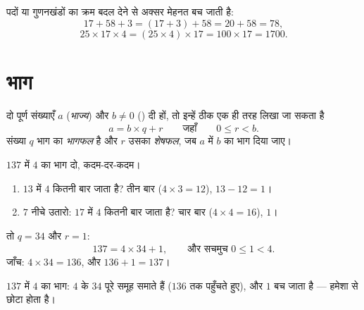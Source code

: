 \begin{example}[चतुराई से गणना]\label{ex:g6:wholes:smart}
पदों या गुणनखंडों का क्रम बदल देने से अक्सर मेहनत बच जाती है:
\[
17 + 58 + 3 = (17 + 3) + 58 = 20 + 58 = 78 ,
\]
\[
25 \times 17 \times 4 = (25 \times 4) \times 17 = 100 \times 17 = 1700 .
\]
\end{example}

\section{भाग}

\begin{theorem}[यूक्लिडीय भाग]\label{thm:g6:wholes:division}
दो पूर्ण संख्याएँ $a$ (\emph{भाज्य}) और $b \neq 0$
(\emph{}) दी हों, तो इन्हें ठीक एक ही तरह लिखा जा सकता है
\[
a = b \times q + r
\qquad\text{जहाँ}\qquad
0 \leq r < b .
\]
संख्या $q$ भाग का \emph{भागफल} है और $r$ उसका
\emph{शेषफल}, जब $a$ में $b$ का भाग दिया जाए।
\end{theorem}
\admitted

\begin{example}\label{ex:g6:wholes:division}
$137$ में $4$ का भाग दो, कदम-दर-कदम।
\begin{enumerate}
  \item $13$ में $4$ कितनी बार जाता है? तीन बार
        ($4 \times 3 = 12$),  $13 - 12 = 1$।
  \item $7$ नीचे उतारो: $17$ में $4$ कितनी बार जाता है?
        चार बार ($4 \times 4 = 16$),  $1$।
\end{enumerate}
तो $q = 34$ और $r = 1$:
\[
137 = 4 \times 34 + 1, \qquad\text{और सचमुच } 0 \leq 1 < 4 .
\]
जाँच: $4 \times 34 = 136$, और $136 + 1 = 137$।
\end{example}

\begin{omfigure}

{\small $137$ में $4$ का भाग: $4$ के $34$ पूरे समूह समाते हैं
($136$ तक पहुँचते हुए), और $1$ बच जाता है ---  हमेशा 
से छोटा होता है।}
\end{omfigure}


